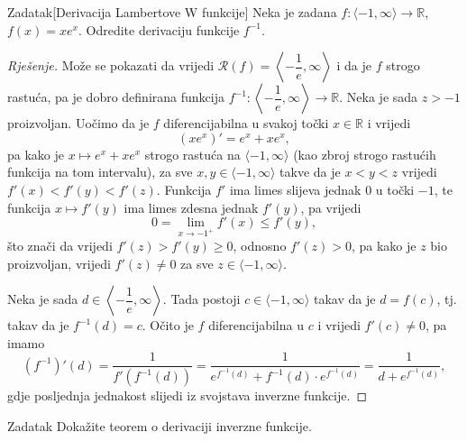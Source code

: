 \begin{exercise}{Zadatak}[Derivacija Lambertove W funkcije]
Neka je zadana \(f : \langle -1, \infty\rangle\to \mathbb{R}\), \(f(x)=xe^x\). Odredite derivaciju funkcije \(f^{-1}\).
\end{exercise}
\begin{proof}[Rješenje]
Može se pokazati da vrijedi \(\mathcal{R}(f)=\left\langle-\dfrac{1}{e}, \infty\right\rangle\) i da je \(f\) strogo rastuća, pa je dobro definirana funkcija \(f^{-1} : \left\langle-\dfrac{1}{e}, \infty\right\rangle\to \mathbb{R}\). Neka je sada \(z>-1\) proizvoljan. Uočimo da je \(f\) diferencijabilna u svakoj točki \(x\in \mathbb{R}\) i vrijedi
\[\left(xe^x\right)'=e^x+xe^x,\]
pa kako je \(x\mapsto e^x+xe^x\) strogo rastuća na \(\langle -1, \infty\rangle\) (kao zbroj strogo rastućih funkcija na tom intervalu), za sve \(x, y\in \langle -1, \infty\rangle\) takve da je \(x<y<z\) vrijedi \(f'(x)<f'(y)<f'(z)\). Funkcija \(f'\) ima limes slijeva jednak \(0\) u točki \(-1\), te funkcija \(x\mapsto f'(y)\) ima limes zdesna jednak \(f'(y)\), pa vrijedi 
\[0=\lim\limits_{x\to -1^+}{f'(x)}\leq f'(y),\]
što znači da vrijedi \(f'(z)>f'(y)\geq 0\), odnosno \(f'(z)>0\), pa kako je \(z\) bio proizvoljan, vrijedi \(f'(z)\neq 0\) za sve \(z\in \langle -1,\infty\rangle\).

Neka je sada \(d\in \left\langle-\dfrac{1}{e}, \infty\right\rangle\). Tada postoji \(c\in \langle -1,\infty\rangle\) takav da je \(d=f(c)\), tj. takav da je \(f^{-1}(d)=c\). Očito je \(f\) diferencijabilna u \(c\) i vrijedi \(f'(c)\neq 0\), pa imamo
\[\left(f^{-1}\right)'(d)=\dfrac{1}{f'\left(f^{-1}(d)\right)}=\dfrac{1}{e^{f^{-1}(d)}+f^{-1}(d)\cdot e^{f^{-1}(d)}}=\dfrac{1}{d+e^{f^{-1}(d)}},\]
gdje posljednja jednakost slijedi iz svojstava inverzne funkcije.
\end{proof}
\begin{exercise}{Zadatak}
Dokažite teorem o derivaciji inverzne funkcije.
\end{exercise}
